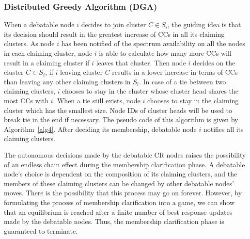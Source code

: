 \documentclass[times]{ettauth}
\theoremstyle{mytheoremstyle}
\theoremstyle{mytheoremstyle}
\theoremstyle{mytheoremstyle}
\begin{document}
\subsubsection{Distributed Greedy Algorithm (DGA)}
When a debatable node $i$ decides to join cluster $C\in S_i$, the guiding idea is that its decision should result in the greatest increase of CCs in all its claiming clusters.
As node $i$ has been notified of the spectrum availability on all the nodes in each claiming cluster, node $i$ is able to calculate how many more CCs will result in a claiming cluster if $i$ leaves that cluster.
Then node $i$ decides on the cluster $C\in S_i$, if $i$ leaving cluster $C$ results in a lower increase in terms of CCs than leaving any other claiming clusters in $S_i$.
In case of a tie between two claiming clusters, $i$ chooses to stay in the cluster whose cluster head shares the most CCs with $i$.
When a tie still exists, node $i$ chooses to stay in the claiming cluster which has the smallest size.
Node IDs of cluster heads will be used to break tie in the end if necessary.
The pseudo code of this algorithm is given by Algorithm~\ref{alg4}.
After deciding its membership, debatable node $i$ notifies all its claiming clusters.

The autonomous decisions made by the debatable CR nodes raises the possibility of an endless chain effect during the membership clarification phase.
A debatable node's choice is dependent on the composition of its claiming clusters, and the members of these claiming clusters can be changed by other debatable nodes' moves.
There is the possibility that this process may go on forever.
However, by formulating the process of membership clarification into a game, we can show that an equilibrium is reached after a finite number of best response updates made by the debatable nodes.
Thus, the membership clarification phase is guaranteed to terminate.
\end{document}
